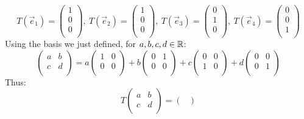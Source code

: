 \documentclass[../main.tex]{subfiles}
\begin{document}
\begin{example}
  \[
    T(\vec{e}_1) = \begin{pmatrix}
    1 \\
    0 \\
    0 \\
    \end{pmatrix},\
    T(\vec{e}_2) = \begin{pmatrix}
    1 \\
    0 \\
    0 \\
    \end{pmatrix},\
    T(\vec{e}_3) = \begin{pmatrix}
    0 \\
    1 \\
    0 \\
    \end{pmatrix},\
    T(\vec{e}_4) = \begin{pmatrix}
    0 \\
    0 \\
    1 \\
    \end{pmatrix}
  \]
  Using the basis we just defined, for $a, b, c, d \in \mathbb{R}$:
  \[
    \begin{pmatrix}
    a & b \\
    c & d \\
    \end{pmatrix} =
    a \begin{pmatrix}
    1 & 0 \\
    0 & 0 \\
    \end{pmatrix} +
    b \begin{pmatrix}
    0 & 1 \\
    0 & 0 \\
    \end{pmatrix} +
    c \begin{pmatrix}
    0 & 0 \\
    1 & 0 \\
    \end{pmatrix} +
    d \begin{pmatrix}
    0 & 0 \\
    0 & 1 \\
    \end{pmatrix}
  \]
  Thus:
  \[
    T\begin{pmatrix}
    a & b \\
    c & d \\
    \end{pmatrix} =
    \begin{pmatrix}

\end{pmatrix}\]
\end{example}
\end{document}
